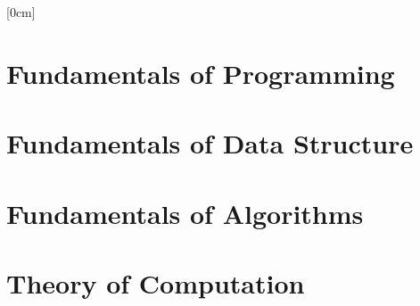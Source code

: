 \documentclass[a4paper]{article}
\begin{document}
	[0cm]
	\section{Fundamentals of Programming}
		
	\section{Fundamentals of Data Structure}
		
	\section{Fundamentals of Algorithms}
		
	\section{Theory of Computation}
		
\end{document}
